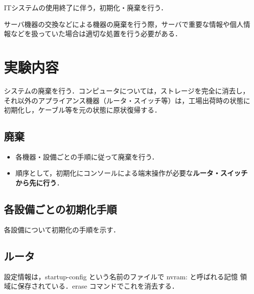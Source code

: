 
ITシステムの使用終了に伴う，初期化・廃棄を行う．

サーバ機器の交換などによる機器の廃棄を行う際，サーバで重要な情報や個人情報などを扱っていた場合は適切な処置を行う必要がある．

\section{実験内容}

システムの廃棄を行う．コンピュータについては，ストレージを完全に消去し，
それ以外のアプライアンス機器（ルータ・スイッチ等）は，工場出荷時の状態に
初期化し，ケーブル等を元の状態に原状復帰する．

\subsection*{廃棄}
 \begin{itemize}
  \item 各機器・設備ごとの手順に従って廃棄を行う．
  \item 順序として，初期化にコンソールによる端末操作が必要な\textbf{ルータ・スイッチから先に行う}．
 \end{itemize}

\subsection{各設備ごとの初期化手順}

各設備について初期化の手順を示す．

\subsection*{ルータ}

設定情報は，startup-config という名前のファイルで nvram: と呼ばれる記憶
領域に保存されている．erase コマンドでこれを消去する．


